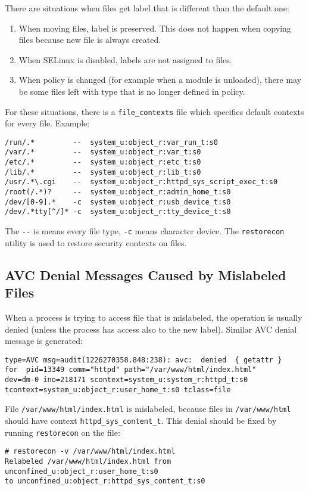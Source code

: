 There are situations when files get label that is different than the default
one:
\begin{enumerate}
    \item When moving files, label is preserved. This does not happen when
        copying files because new file is always created.
    \item When SELinux is disabled, labels are not assigned to files.
    \item When policy is changed (for example when a module is unloaded), there
        may be some files left with type that is no longer defined in policy.
\end{enumerate}
For these situations, there is a \texttt{file\_contexts} file which specifies
default contexts for every file. Example:
\begin{lstlisting}
/run/.*         --  system_u:object_r:var_run_t:s0
/var/.*	        --  system_u:object_r:var_t:s0
/etc/.*	        --  system_u:object_r:etc_t:s0
/lib/.*	        --  system_u:object_r:lib_t:s0
/usr/.*\.cgi    --  system_u:object_r:httpd_sys_script_exec_t:s0
/root(/.*)?     --  system_u:object_r:admin_home_t:s0
/dev/[0-9].*    -c  system_u:object_r:usb_device_t:s0
/dev/.*tty[^/]* -c  system_u:object_r:tty_device_t:s0
\end{lstlisting}
The \texttt{-{}-} is means every file type, \texttt{-c} means character device.
The \texttt{restorecon} utility is used to restore security contexts on files.

\subsection{AVC Denial Messages Caused by Mislabeled Files}
When a process is trying to access file that is mislabeled, the operation is
usually denied (unless the process has access also to the new label). Similar
AVC denial message is generated:
\begin{lstlisting}
type=AVC msg=audit(1226270358.848:238): avc:  denied  { getattr }
for  pid=13349 comm="httpd" path="/var/www/html/index.html"
dev=dm-0 ino=218171 scontext=system_u:system_r:httpd_t:s0
tcontext=system_u:object_r:user_home_t:s0 tclass=file
\end{lstlisting}
File \texttt{/var/www/html/index.html} is mislabeled, because files in
\texttt{/var/www/html} should have context \texttt{httpd\_sys\_content\_t}. This
denial should be fixed by running \texttt{restorecon} on the file:
\begin{lstlisting}
# restorecon -v /var/www/html/index.html
Relabeled /var/www/html/index.html from unconfined_u:object_r:user_home_t:s0
to unconfined_u:object_r:httpd_sys_content_t:s0
\end{lstlisting}

